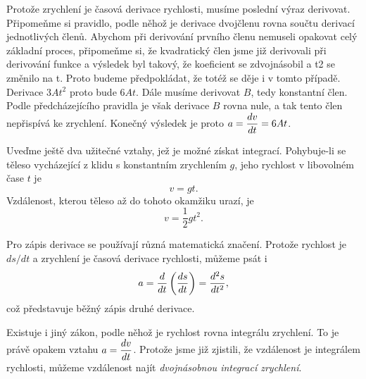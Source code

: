 {    Protože zrychlení je časová derivace rychlosti, musíme poslední výraz derivovat. Připomeňme si 
    pravidlo, podle něhož je derivace dvojčlenu rovna součtu derivací jednotlivých členů. Abychom 
    při derivování prvního členu nemuseli opakovat celý základní proces, připomeňme si, že 
    kvadratický člen jsme již derivovali při derivování funkce a výsledek byl takový, že koeficient 
    se zdvojnásobil a t2 se změnilo na t. Proto budeme předpokládat, že totéž se děje i v tomto 
    případě. Derivace \(3At^2\) proto bude \(6At\). Dále musíme derivovat \(B\), tedy konstantní 
    člen. Podle předcházejícího pravidla je však derivace \(B\) rovna nule, a tak tento člen 
    nepřispívá ke zrychlení. Konečný výsledek je proto \(a=\dfrac{d v}{d t}= 6At\).
    
    Uveďme ještě dva užitečné vztahy, jež je možné získat integrací. Pohybuje-li se těleso 
    vycházející z klidu s konstantním zrychlením \(g\), jeho rychlost v libovolném čase \(t\) je
    \begin{equation}\label{FYZ:eq103}
      v = gt.
    \end{equation}
    Vzdálenost, kterou těleso až do tohoto okamžiku urazí, je
    \begin{equation}\label{FYZ:eq104}
      v = \frac{1}{2}gt^2.
    \end{equation}
    
    Pro zápis derivace se používají různá matematická značení. Protože rychlost je \(ds/dt\) a 
    zrychlení je časová derivace rychlosti, můžeme psát i
    \begin{equation}\label{FYZ:eq105}
      a = \dfrac{d  }{d t}\left(\dfrac{d s}{d t}\right) = \dfrac{d^2 s}{d t^2},
    \end{equation}
    což představuje běžný zápis druhé derivace.
    
    Existuje i jiný zákon, podle něhož je rychlost rovna integrálu zrychlení. To je právě opakem 
    vztahu \(a = \dfrac{d v}{d t}\). Protože jsme již zjistili, že vzdálenost je integrálem rychlosti, 
    můžeme vzdálenost najít \emph{dvojnásobnou integrací zrychlení}.
    
}
